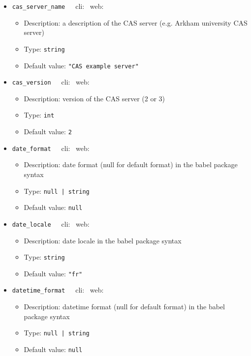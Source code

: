 {\begin{itemize}[itemsep=0pt,parsep=0pt,topsep=0pt,partopsep=0pt]
\begin{itemize}[itemsep=0pt,parsep=0pt,topsep=0pt,partopsep=0pt]
  \end{itemize}
\item{\tt{cas\_server\_name}}~~~cli: \xmark~web: \cmark
  \begin{itemize}[itemsep=0pt,parsep=0pt,topsep=0pt,partopsep=0pt]
  \item Description:  a description of the CAS server (e.g. Arkham university CAS server)
  \item Type:  {\tt{string}}
  \item Default value:  {\tt{"CAS example server"}}
  \end{itemize}
\item{\tt{cas\_version}}~~~cli: \xmark~web: \cmark
  \begin{itemize}[itemsep=0pt,parsep=0pt,topsep=0pt,partopsep=0pt]
  \item Description:  version of the CAS server (2 or 3)
  \item Type:  {\tt{int}}
  \item Default value:  {\tt{2}}
  \end{itemize}
\item{\tt{date\_format}}~~~cli: \xmark~web: \cmark
  \begin{itemize}[itemsep=0pt,parsep=0pt,topsep=0pt,partopsep=0pt]
  \item Description:  date format (null for default format) in the babel package syntax
  \item Type:  {\tt{null | string}}
  \item Default value:  {\tt{null}}
  \end{itemize}
\item{\tt{date\_locale}}~~~cli: \xmark~web: \cmark
  \begin{itemize}[itemsep=0pt,parsep=0pt,topsep=0pt,partopsep=0pt]
  \item Description:  date locale in the babel package syntax
  \item Type:  {\tt{string}}
  \item Default value:  {\tt{"fr"}}
  \end{itemize}
\item{\tt{datetime\_format}}~~~cli: \xmark~web: \cmark
  \begin{itemize}[itemsep=0pt,parsep=0pt,topsep=0pt,partopsep=0pt]
  \item Description:  datetime format (null for default format) in the babel package syntax
  \item Type:  {\tt{null | string}}
  \item Default value:  {\tt{null}}

\end{itemize}
\end{itemize}}
